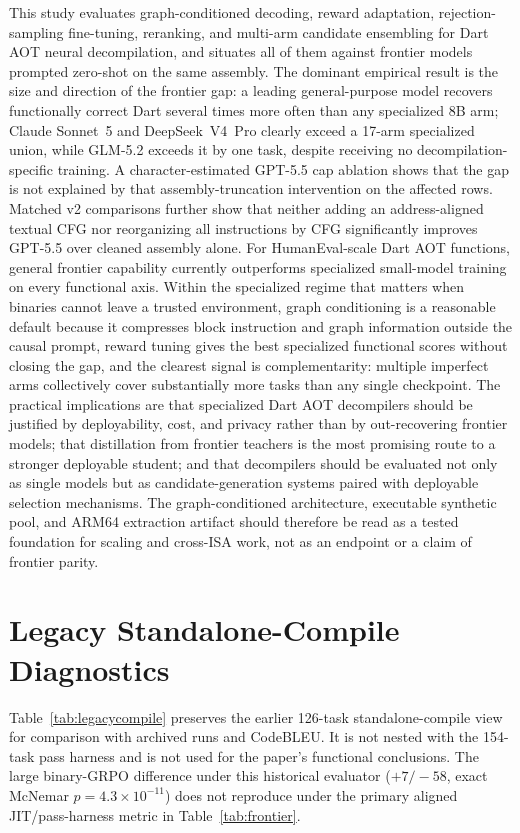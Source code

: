 \documentclass[11pt]{article}
\begin{document}
This study evaluates graph-conditioned decoding, reward adaptation, rejection-sampling fine-tuning, reranking, and multi-arm candidate ensembling for Dart AOT neural decompilation, and situates all of them against frontier models prompted zero-shot on the same assembly. The dominant empirical result is the size and direction of the frontier gap: a leading general-purpose model recovers functionally correct Dart several times more often than any specialized 8B arm; Claude Sonnet~5 and DeepSeek~V4~Pro clearly exceed a 17-arm specialized union, while GLM-5.2 exceeds it by one task, despite receiving no decompilation-specific training. A character-estimated GPT-5.5 cap ablation shows that the gap is not explained by that assembly-truncation intervention on the affected rows. Matched v2 comparisons further show that neither adding an address-aligned textual CFG nor reorganizing all instructions by CFG significantly improves GPT-5.5 over cleaned assembly alone. For HumanEval-scale Dart AOT functions, general frontier capability currently outperforms specialized small-model training on every functional axis. Within the specialized regime that matters when binaries cannot leave a trusted environment, graph conditioning is a reasonable default because it compresses block instruction and graph information outside the causal prompt, reward tuning gives the best specialized functional scores without closing the gap, and the clearest signal is complementarity: multiple imperfect arms collectively cover substantially more tasks than any single checkpoint. The practical implications are that specialized Dart AOT decompilers should be justified by deployability, cost, and privacy rather than by out-recovering frontier models; that distillation from frontier teachers is the most promising route to a stronger deployable student; and that decompilers should be evaluated not only as single models but as candidate-generation systems paired with deployable selection mechanisms. The graph-conditioned architecture, executable synthetic pool, and ARM64 extraction artifact should therefore be read as a tested foundation for scaling and cross-ISA work, not as an endpoint or a claim of frontier parity.

\appendix

\section{Legacy Standalone-Compile Diagnostics}
\label{app:legacycompile}

Table~\ref{tab:legacycompile} preserves the earlier 126-task standalone-compile view for comparison with archived runs and CodeBLEU. It is not nested with the 154-task pass harness and is not used for the paper's functional conclusions. The large binary-GRPO difference under this historical evaluator (\(+7/-58\), exact McNemar \(p=4.3{\times}10^{-11}\)) does not reproduce under the primary aligned JIT/pass-harness metric in Table~\ref{tab:frontier}.
\end{document}
